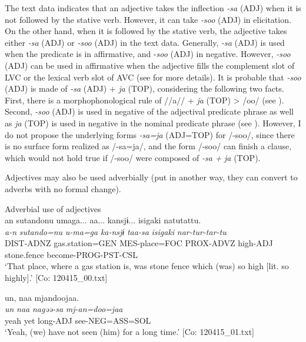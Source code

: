 The text data indicates that an adjective takes the inflection \textit{{}-sa} (ADJ) when it is not followed by the stative verb. However, it can take \textit{{}-soo} (ADJ) in elicitation. On the other hand, when it is followed by the stative verb, the adjective takes either \textit{{}-sa} (ADJ) or \textit{{}-soo} (ADJ) in the text data. Generally, \textit{{}-sa} (ADJ) is used when the predicate is in affirmative, and -\textit{soo} (ADJ) in negative. However, \textit{{}-soo} (ADJ) can be used in affirmative when the adjective fills the complement slot of LVC or the lexical verb slot of AVC (see  for more details). It is probable that \textit{{}-soo} (ADJ) is made of \textit{{}-sa} (ADJ) + \textit{ja} (TOP), considering the following two facts. First, there is a morphophonological rule of //a// + \textit{ja} (TOP) > /oo/ (see ). Second, \textit{{}-soo} (ADJ) is used in negative of the adjectival predicate phrase as well as \textit{ja} (TOP) is used in negative in the nominal predicate phrase (see ). However, I do not propose the underlying forms \textit{{}-sa=ja} (ADJ=TOP) for /-soo/, since there is no surface form realized as /-sa=ja/, and the form /-soo/ can finish a clause, which would not hold true if /-soo/ were composed of \textit{{}-sa} \textit{+} \textit{ja} (TOP).

Adjectives may also be used adverbially (put in another way, they can convert to adverbs with no formal change).

\ea  Adverbial use of adjectives \label{ex:4.51}
\ea{}\\
\glll    an  {\textbar}sutando{\textbar}nu  umaga...  aa...  kansjɨ...    isigaki  natutattu.\\
      \textit{a-n}  \textit{sutando=nu}  \textit{u-ma=ga}    \textit{ka-nsjɨ}  \textit{taa-sa}  \textit{isigaki}  \textit{nar-tur-tar-tu}\\
      DIST-ADNZ  gas.station=GEN  MES-place=FOC    PROX-ADVZ    high-ADJ  stone.fence  become-PROG-PST-CSL\\
      \glt       ‘That place, where a gas station is, was stone fence which (was) so high [lit. so highly].’ [Co: 120415\_00.txt]

\ex{}%
\glll     {\textbar}un{\textbar},  naa    mjandoojaa.\\
      \textit{un}  \textit{naa}  \textit{nagəə-sa}  \textit{mj-an=doo=jaa}\\
      yeah  yet  long-ADJ  see-NEG=ASS=SOL\\
      \glt       ‘Yeah, (we) have not seen (him) for a long time.’ [Co: 120415\_01.txt]

